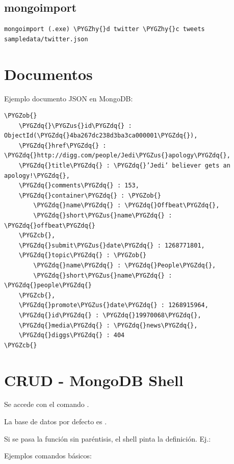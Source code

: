 \documentclass[a4paper,10pt,english]{sphinxmanual}
\def\PYGZus{\char`\_}
\def\PYGZob{\char`\{}
\def\PYGZcb{\char`\}}
\def\PYGZhy{\char`\-}
\def\PYGZdq{\char`\"}
\begin{document}
\section{mongoimport}
\label{contents/comandos:mongoimport}
\begin{Verbatim}[commandchars=\\\{\}]
mongoimport (.exe) \PYGZhy{}d twitter \PYGZhy{}c tweets sampledata/twitter.json
\end{Verbatim}


\chapter{Documentos}
\label{contents/documents::doc}\label{contents/documents:documentos}
Ejemplo documento JSON en MongoDB:

\begin{Verbatim}[commandchars=\\\{\}]
\PYGZob{}
    \PYGZdq{}\PYGZus{}id\PYGZdq{} : ObjectId(\PYGZdq{}4ba267dc238d3ba3ca000001\PYGZdq{}),
    \PYGZdq{}href\PYGZdq{} : \PYGZdq{}http://digg.com/people/Jedi\PYGZus{}apology\PYGZdq{},
    \PYGZdq{}title\PYGZdq{} : \PYGZdq{}’Jedi’ believer gets an apology!\PYGZdq{},
    \PYGZdq{}comments\PYGZdq{} : 153,
    \PYGZdq{}container\PYGZdq{} : \PYGZob{}
        \PYGZdq{}name\PYGZdq{} : \PYGZdq{}Offbeat\PYGZdq{},
        \PYGZdq{}short\PYGZus{}name\PYGZdq{} : \PYGZdq{}offbeat\PYGZdq{}
    \PYGZcb{},
    \PYGZdq{}submit\PYGZus{}date\PYGZdq{} : 1268771801,
    \PYGZdq{}topic\PYGZdq{} : \PYGZob{}
        \PYGZdq{}name\PYGZdq{} : \PYGZdq{}People\PYGZdq{},
        \PYGZdq{}short\PYGZus{}name\PYGZdq{} : \PYGZdq{}people\PYGZdq{}
    \PYGZcb{},
    \PYGZdq{}promote\PYGZus{}date\PYGZdq{} : 1268915964,
    \PYGZdq{}id\PYGZdq{} : \PYGZdq{}19970068\PYGZdq{},
    \PYGZdq{}media\PYGZdq{} : \PYGZdq{}news\PYGZdq{},
    \PYGZdq{}diggs\PYGZdq{} : 404
\PYGZcb{}
\end{Verbatim}


\chapter{CRUD - MongoDB Shell}
\label{contents/shell:crud-mongodb-shell}\label{contents/shell::doc}
Se accede con el comando .

La base de datos por defecto es .

Si se pasa la función sin paréntisis, el shell pinta la definición. Ej.: 

Ejemplos comandos básicos:
\end{document}
